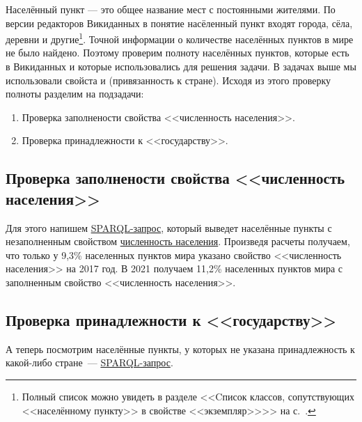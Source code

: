 Населённый пункт — это общее название мест с постоянными жителями\autocite{Humansettlements_Dictionary}. По версии редакторов Викиданных в понятие насёленный пункт входят города, сёла, деревни и другие\footnote{Полный список можно увидеть в разделе <<Cписок классов, сопутствующих <<населённому пункту>> в свойстве <<экземпляр>>>> на с.~\pageref{human-settlement:tag1}.}.
Точной информации о количестве населённых пунктов в мире не было найдено. Поэтому проверим полноту населённых пунктов, которые есть в Викиданных и которые использовались для решения задачи. В задачах выше мы использовали свойста  и  (привязанность к стране). Исходя из этого проверку полноты разделим на подзадачи: 
\begin{enumerate} 
  \item Проверка заполнености свойства <<численность населения>>.
  \item Проверка принадлежности к <<государству>>.
\end{enumerate}

\subsection{Проверка заполнености свойства <<численность населения>> }

Для этого напишем \href{https://w.wiki/4FUz}{SPARQL-запрос}\footnotemark, который выведет населённые пункты с незаполненным свойством \href{http://www.wikidata.org/entity/P1082}{численность населения}. 
Произведя расчеты получаем, что только у 9,3\% населенных пунктов мира указано свойство <<численность населения>> на 2017 год. В 2021 получаем 11,2\% населенных пунктов мира с заполненным свойство <<численность населения>>.

\subsection{Проверка принадлежности к <<государству>>}

А теперь посмотрим населённые пункты, у которых не указана принадлежность к какой-либо стране~--- \href{https://w.wiki/4FV8}{SPARQL-запрос}\footnotemark.

